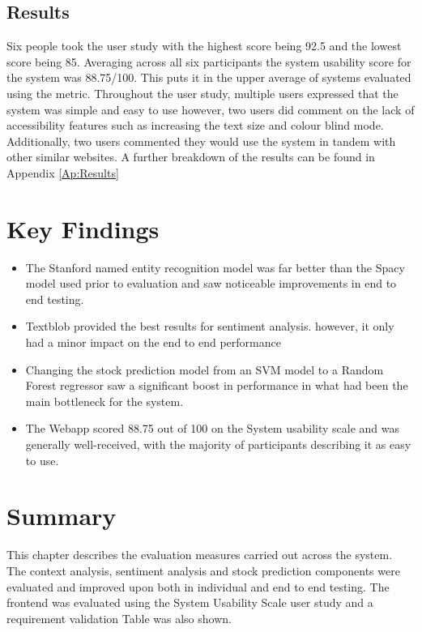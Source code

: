         \subsection{Results}
        Six people took the user study with the highest score being 92.5 and the lowest score being 85. Averaging across all six participants the system usability score for the system was 88.75/100. This puts it in the upper average of systems evaluated using the metric. Throughout the user study, multiple users expressed that the system was simple and easy to use however, two users did comment on the lack of accessibility features such as increasing the text size and colour blind mode. Additionally, two users commented they would use the system in tandem with other similar websites. A further breakdown of the results can be found in Appendix \ref{Ap:Results}
        
    \section{Key Findings}
        
    \begin{itemize}
        \item The Stanford \citep{technology:Stanza} named entity recognition model was far better than the Spacy \cite{technology:Spacy} model used prior to evaluation and saw noticeable improvements in end to end testing. 
        
        \item Textblob \citep{technology:Textblob} provided the best results for sentiment analysis. however, it only had a minor impact on the end to end performance
        
        \item Changing the stock prediction model from an SVM model to a Random Forest regressor saw a significant boost in performance in what had been the main bottleneck for the system.
        
        \item The Webapp scored 88.75 out of 100 on the System usability scale and was generally well-received, with the majority of participants describing it as easy to use.
    \end{itemize}
    
    
    \section{Summary}
    This chapter describes the evaluation measures carried out across the system. The context analysis, sentiment analysis and stock prediction components were evaluated and improved upon both in individual and end to end testing. The frontend was evaluated using the System Usability Scale user study and a requirement validation Table was also shown.